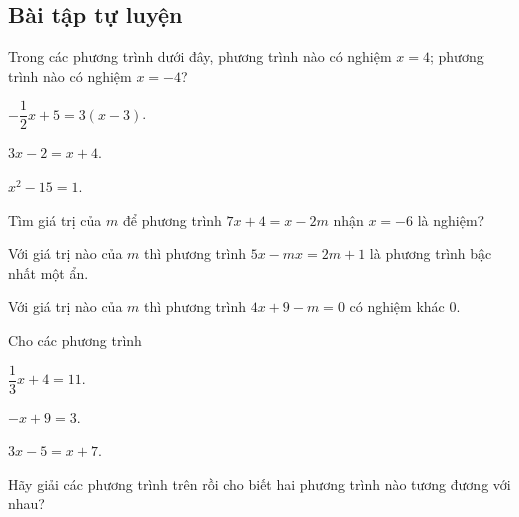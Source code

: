 \subsection{Bài tập tự luyện}
\begin{bt}%
	Trong các phương trình dưới đây, phương trình nào có nghiệm $x=4$; phương trình nào có nghiệm $x=-4$?
	\begin{enumEX}{3}
		\item $-\dfrac{1}{2}x+5=3\left(x-3\right)$.
		\item $3x-2=x+4$.
		\item $x^2-15=1$.
	\end{enumEX}
\end{bt}
\begin{bt}%
	Tìm giá trị của $m$ để phương trình $7x+4=x-2m$ nhận $x=-6$ là nghiệm?
\end{bt}
\begin{bt}%
	Với giá trị nào của $m$ thì phương trình $5x-mx=2m+1$ là phương trình bậc nhất một ẩn.
\end{bt}
\begin{bt}%
	Với giá trị nào của $m$ thì phương trình $4x+9-m=0$ có nghiệm khác $0$.
\end{bt}
\begin{bt}%
	Cho các phương trình
	\begin{enumEX}{3}
		\item $\dfrac{1}{3}x+4=11$.
		\item $-x+9=3$.
		\item $3x-5=x+7$.
	\end{enumEX}
	Hãy giải các phương trình trên rồi cho biết hai phương trình nào tương đương với nhau?
\end{bt}
